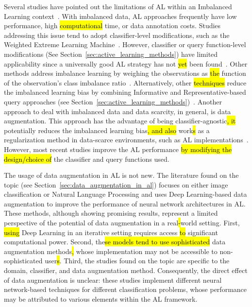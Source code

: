 \documentclass[preprint, 12pt]{elsarticle}
\begin{document}
Several studies have pointed out the limitations of AL within an Imbalanced
Learning context~\cite{Yu2019}. With imbalanced data, AL approaches frequently
have low performance, high \hl{computational} time, or\hl{ }data annotation
costs.  Studies addressing this issue tend to adopt classifier-level
modifications, such as the Weighted Extreme Learning Machine~\cite{Yu2019,
Zong2013, Qin2021}. However, classifier or query function-level modifications
(See Section~\ref{sec:active_learning_methods}) have limited applicability
since a universally good AL strategy has not \hl{yet} been found~\cite{Sener2018}.
Other methods address imbalance learning by weighing the observations as
\hl{the} function of the observation's class imbalance ratio~\cite{Liu2021}.
Alternatively, other \hl{techniques }reduce the imbalanced learning bias by
combining Informative and Representative-based query approaches (see
Section~\ref{sec:active_learning_methods})~\cite{Tharwat2020}. Another
approach to deal with imbalanced data and data scarcity, in general, is data
augmentation. This approach has the advantage of being\hl{
}classifier-agnostic\hl{, it }potentially reduces the imbalanced learning
bias\hl{, and also} work\hl{s} as a regularization method in data-scarce
environments, such as AL implementations~\cite{Kim2021}. However, most recent
studies\hl{ }improve the AL performance \hl{by modifying the design/choice of}
the classifier and query functions used.
 
The usage of data augmentation in AL is not new. The literature found on the
topic (see Section~\ref{sec:data_augmentation_in_al}) focuses on either image
classification or Natural Language Processing and uses Deep Learning-based
data augmentation to improve the performance of neural network architectures
in AL\@. These methods, although showing promising results, represent a
limited perspective of the potential of data augmentation in a real\hl{-}world
setting. First, \hl{using} Deep Learning in an iterative setting requires\hl{
}access \hl{to} significant computational power. Second, the\hl{se models tend
to use sophisticated} data augmentation methods\hl{,} whose implementation may
not be accessible to non-sophisticated user\hl{s}. Third, the studies found on
the topic are specific to the domain, classifier, and data augmentation
method.  Consequently, the direct effect of data augmentation is unclear:
these studies implement different neural network-based techniques for
different classification problems, whose performance may be attributed to
various elements within the AL framework.
\end{document}
